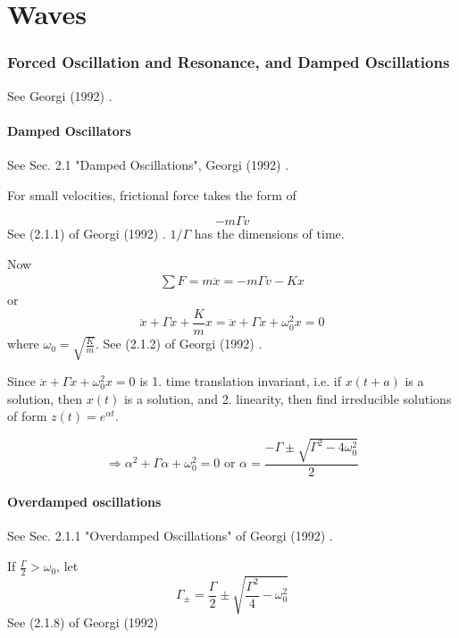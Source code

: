 \part{Waves}


\section{Forced Oscillation and Resonance, and Damped Oscillations}

See Georgi (1992) \cite{agat:Geor1992}.

\subsection{Damped Oscillators}

See Sec. 2.1 "Damped Oscillations", Georgi (1992) \cite{agat:Geor1992}.

For small velocities, frictional force takes the form of

\begin{equation}
	-m\Gamma v
\end{equation}
See (2.1.1) of Georgi (1992) \cite{agat:Geor1992}. $1/\Gamma$ has the dimensions of time.

Now
\[
\begin{gathered}
	\sum F = m\ddot{x} = -m \Gamma v - Kx
\end{gathered}
\]
or
\begin{equation}
	\ddot{x} + \Gamma \dot{x} + \frac{K}{m} x = \ddot{x} + \Gamma \dot{x} + \omega_0^2 x = 0
\end{equation}
where $\omega_0 = \sqrt{ \frac{K}{m} }$. See (2.1.2) of Georgi (1992) \cite{agat:Geor1992}.

Since $\ddot{x} + \Gamma \dot{x} + \omega_0^2 x = 0$ is 1. time translation invariant, i.e. if $x(t+a)$ is a solution, then $x(t)$ is a solution, and 2. linearity, then find irreducible solutions of form $z(t) = e^{\alpha t}$.

\[
\Longrightarrow \alpha^2 + \Gamma \alpha + \omega_0^2 =0 \text{ or } \alpha = \frac{ -\Gamma \pm \sqrt{ \Gamma^2 - 4\omega_0^2}}{2}
\]

\subsection{Overdamped oscillations} See Sec. 2.1.1 "Overdamped Oscillations" of Georgi (1992) \cite{agat:Geor1992}.

If $\frac{\Gamma}{2} > \omega_0$, let
\begin{equation}
	\Gamma_{\pm} = \frac{\Gamma}{2} \pm \sqrt{ \frac{\Gamma^2}{4} - \omega_0^2}
\end{equation}
See (2.1.8) of Georgi (1992) \cite{agat:Geor1992}

